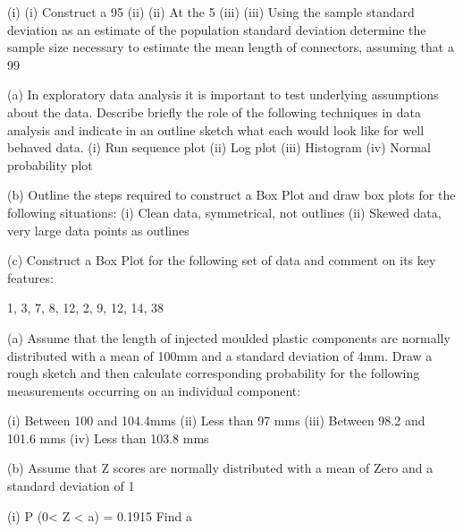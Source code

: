 (i)	(i)                  Construct a 95%
(ii)	(ii)                At the 5%
(iii)	(iii)               Using the sample standard deviation as an estimate of the population standard deviation determine the sample size necessary to estimate the mean length of connectors, assuming that a 99%



(a)	In exploratory data analysis it is important to test underlying assumptions about the data.  Describe briefly the role of the following techniques in data analysis and indicate in an outline sketch what each would look like for well behaved data.
(i)	Run sequence plot
(ii)	Log plot
(iii)	Histogram
(iv)	Normal probability plot


(b)	Outline the steps required to construct a Box Plot and draw box plots for the following situations:
(i)	Clean data, symmetrical, not outlines
(ii)	Skewed data, very large data points as outlines

(c)	Construct a Box Plot for the following set of data and comment on its key features:

1, 3, 7, 8, 12, 2, 9, 12, 14, 38



(a)	Assume that the length of injected moulded plastic components are normally distributed with a mean of 100mm and a standard deviation of 4mm.  Draw a rough sketch and then calculate corresponding probability for the following measurements occurring on an individual component:
 
(i)	Between 100 and 104.4mms
(ii)	Less than 97 mms
(iii)	Between 98.2 and 101.6 mms
(iv)	Less than 103.8 mms


(b)	Assume that Z scores are normally distributed with a mean of Zero and a
 	standard deviation of 1
 
(i) 	P (0< Z < a)  =  0.1915 			 Find   a 

